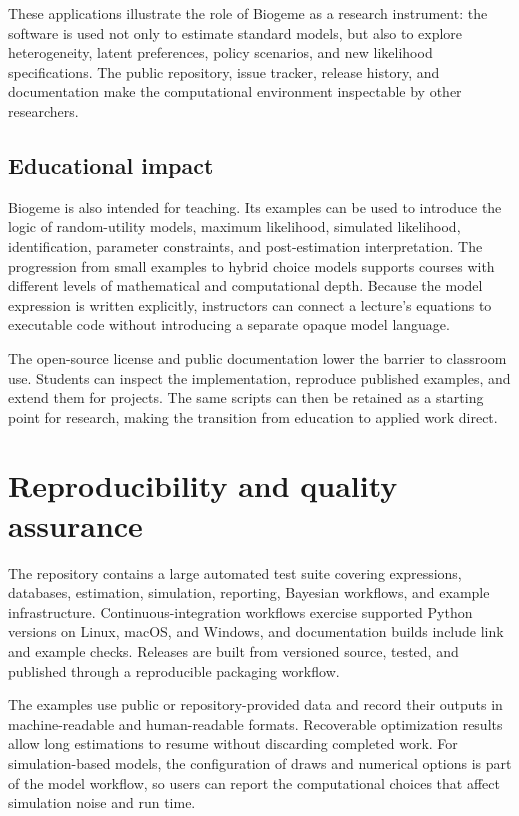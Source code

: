 \documentclass[11pt]{article}
\begin{document}
These applications illustrate the role of Biogeme as a research instrument:
the software is used not only to estimate standard models, but also to explore
heterogeneity, latent preferences, policy scenarios, and new likelihood
specifications. The public repository, issue tracker, release history, and
documentation make the computational environment inspectable by other
researchers.

\subsection{Educational impact}

Biogeme is also intended for teaching. Its examples can be used to introduce
the logic of random-utility models, maximum likelihood, simulated likelihood,
identification, parameter constraints, and post-estimation interpretation.
The progression from small examples to hybrid choice models supports courses
with different levels of mathematical and computational depth. Because the
model expression is written explicitly, instructors can connect a lecture's
equations to executable code without introducing a separate opaque model
language.

The open-source license and public documentation lower the barrier to classroom
use. Students can inspect the implementation, reproduce published examples,
and extend them for projects. The same scripts can then be retained as a
starting point for research, making the transition from education to applied
work direct.

\section{Reproducibility and quality assurance}

The repository contains a large automated test suite covering expressions,
databases, estimation, simulation, reporting, Bayesian workflows, and example
infrastructure. Continuous-integration workflows exercise supported Python
versions on Linux, macOS, and Windows, and documentation builds include link
and example checks. Releases are built from versioned source, tested, and
published through a reproducible packaging workflow.

The examples use public or repository-provided data and record their outputs in
machine-readable and human-readable formats. Recoverable optimization results
allow long estimations to resume without discarding completed work. For
simulation-based models, the configuration of draws and numerical options is
part of the model workflow, so users can report the computational choices that
affect simulation noise and run time.
\end{document}
